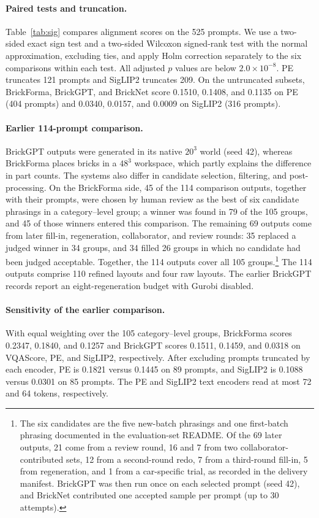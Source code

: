 \paragraph{Paired tests and truncation.}
Table~\ref{tab:sig} compares alignment scores on the 525 prompts. We use a two-sided exact sign test and a two-sided Wilcoxon signed-rank test with the normal approximation, excluding ties, and apply Holm correction separately to the six comparisons within each test. All adjusted $p$ values are below $2.0{\times}10^{-8}$. PE truncates 121 prompts and SigLIP2 truncates 209. On the untruncated subsets, BrickForma, BrickGPT, and BrickNet score 0.1510, 0.1408, and 0.1135 on PE (404 prompts) and 0.0340, 0.0157, and 0.0009 on SigLIP2 (316 prompts).



\paragraph{Earlier 114-prompt comparison.} BrickGPT outputs were generated in its native $20^3$ world (seed 42), whereas BrickForma places bricks in a $48^3$ workspace, which partly explains the difference in part counts. The systems also differ in candidate selection, filtering, and post-processing. On the BrickForma side, 45 of the 114 comparison outputs, together with their prompts, were chosen by human review as the best of six candidate phrasings in a category--level group; a winner was found in 79 of the 105 groups, and 45 of those winners entered this comparison. The remaining 69 outputs come from later fill-in, regeneration, collaborator, and review rounds: 35 replaced a judged winner in 34 groups, and 34 filled 26 groups in which no candidate had been judged acceptable. Together, the 114 outputs cover all 105 groups.\footnote{The six candidates are the five new-batch phrasings and one first-batch phrasing documented in the evaluation-set README. Of the 69 later outputs, 21 come from a review round, 16 and 7 from two collaborator-contributed sets, 12 from a second-round redo, 7 from a third-round fill-in, 5 from regeneration, and 1 from a car-specific trial, as recorded in the delivery manifest. BrickGPT was then run once on each selected prompt (seed 42), and BrickNet contributed one accepted sample per prompt (up to 30 attempts).} The 114 outputs comprise 110 refined layouts and four raw layouts. The earlier BrickGPT records report an eight-regeneration budget with Gurobi disabled.

\paragraph{Sensitivity of the earlier comparison.}
With equal weighting over the 105 category--level groups, BrickForma scores 0.2347, 0.1840, and 0.1257 and BrickGPT scores 0.1511, 0.1459, and 0.0318 on VQAScore, PE, and SigLIP2, respectively. After excluding prompts truncated by each encoder, PE is 0.1821 versus 0.1445 on 89 prompts, and SigLIP2 is 0.1088 versus 0.0301 on 85 prompts. The PE and SigLIP2 text encoders read at most 72 and 64 tokens, respectively.

